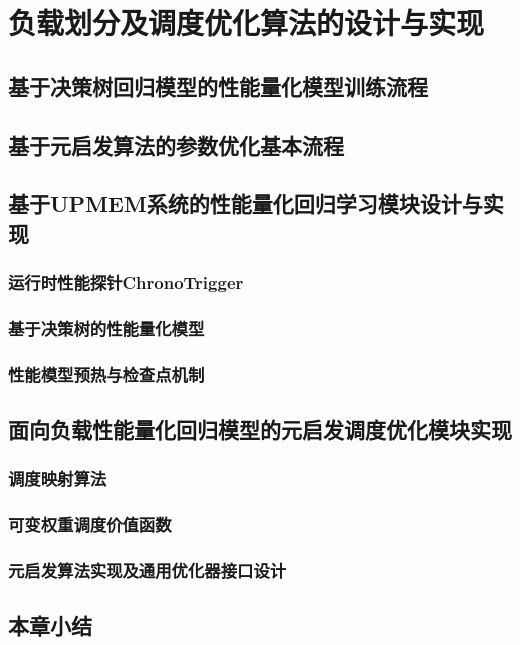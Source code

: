 \chapter{负载划分及调度优化算法的设计与实现}\label{chap:Metaheuristic_Based_Schedule_Optimization} 

\section{基于决策树回归模型的性能量化模型训练流程}\label{sec:decision_tree_based_quant_regression_procedure}
\section{基于元启发算法的参数优化基本流程}\label{sec:metaheuristic_optimization_procedure}

\section{基于UPMEM系统的性能量化回归学习模块设计与实现}\label{sec:UPMEM_SKMD_regression_model}
    \subsection{运行时性能探针ChronoTrigger}\label{subsec:runtime_perf_probe_impl}
    \subsection{基于决策树的性能量化模型}\label{subsec:decision_tree_based_model_impl}
    \subsection{性能模型预热与检查点机制}\label{subsec:warmup_and_checkpoint_impl}
    
\section{面向负载性能量化回归模型的元启发调度优化模块实现}\label{sec:metaheuristic_optimizer_facing_SKMD_regression_model}
    \subsection{调度映射算法}\label{subsec:schedule_vec_mapping_algorithm_design}
    \subsection{可变权重调度价值函数}\label{subsec:schedule_evaluation_func_design}
    \subsection{元启发算法实现及通用优化器接口设计}\label{subsec:metaheuristic_algorithm_implement_and_general_interface}

\section{本章小结}\label{sec:chap4_summary}
